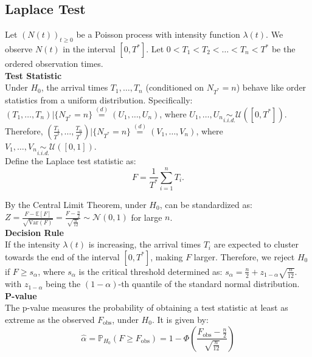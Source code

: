 \documentclass{journalstyle}
\begin{document}
\subsection{Laplace Test}

Let $(N(t))_{t \geq 0}$ be a Poisson process with intensity function $\lambda(t)$.
We observe $N(t)$ in the interval $[0, T^*]$.
Let $0 < T_1 < T_2 < \ldots < T_n < T^*$ be the ordered observation times. \\

\noindent\textbf{Test Statistic} \\
Under $H_0$, the arrival times $T_1, \ldots, T_n$ (conditioned on $N_{T^*} = n$) behave like order statistics from a uniform distribution.
Specifically: \\
$(T_1, \ldots, T_n) | \{N_{T^*} = n\} \overset{(d)}{=} (U_1, \ldots, U_n)$, where $U_1, \ldots, U_n \underset{i.i.d.}{\sim} \mathcal{U}([0, T^*])$. \\
Therefore, $(\frac{T_1}{T^*}, \ldots, \frac{T_n}{T^*}) | \{N_{T^*} = n\} \overset{(d)}{=} (V_1, \ldots, V_n)$, where $V_1, \ldots, V_n \underset{i.i.d.}{\sim} \mathcal{U}([0, 1])$. \\
Define the Laplace test statistic as: 
\begin{equation}
    F = \frac{1}{T^*} \sum_{i=1}^n T_i.
    \label{eq:laplace_test_statistic}
\end{equation}

By the Central Limit Theorem, under $H_0$,  can be standardized as: 
$Z = \frac{F - \mathbb{E}[F]}{\sqrt{\text{Var}(F)}} = \frac{F - \frac{n}{2}}{\sqrt{\frac{n}{12}}} \sim \mathcal{N}(0, 1)$
for large $n$. \\

\noindent\textbf{Decision Rule} \\
If the intensity $\lambda(t)$ is increasing, the arrival times $T_i$ are expected to cluster towards the end of the interval $[0, T^*]$, making $F$ larger.
Therefore, we reject $H_0$ if $F \geq s_{\alpha}$, where $s_{\alpha}$ is the critical threshold determined as: $s_{\alpha} = \frac{n}{2} + z_{1 - \alpha} \sqrt{\frac{n}{12}}$. \\
with $z_{1 - \alpha}$ being the $(1 - \alpha)$-th quantile of the standard normal distribution. \\

\noindent\textbf{P-value} \\
The p-value measures the probability of obtaining a test statistic at least as extreme as the observed $F_{\text{obs}}$, under $H_0$.
It is given by:
\begin{equation}
    \hat{\alpha} = \mathbb{P}_{H_0}(F \geq F_{\text{obs}}) = 1 - \Phi\left(\frac{F_{\text{obs}} - \frac{n}{2}}{\sqrt{\frac{n}{12}}}\right)
    \label{eq:laplace_p_value}
\end{equation}
\end{document}
